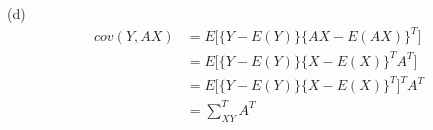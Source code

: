 \documentclass[fleqn]{article}
\begin{document}
(d)\\

\begin{equation*}
\begin{split}
cov(Y, AX) &= E\big[\{Y - E(Y)\}  \{AX - E(AX)\}^T\big]\\
&= E\big[\{Y - E(Y)\}  \{X - E(X)\}^T A^T \big]\\
&= E\big[\{Y - E(Y)\}  \{X - E(X)\}^T\big]^T A^T\\
&= \sum\nolimits_{XY}^T A^T
\end{split}
\end{equation*}
\end{document}

